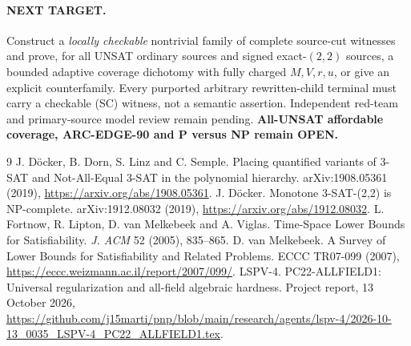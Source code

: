 \documentclass[11pt]{article}
\begin{document}
\paragraph{NEXT TARGET.} Construct a \emph{locally checkable} nontrivial family of complete source-cut witnesses and prove, for all UNSAT ordinary sources and signed exact-$(2,2)$ sources, a bounded adaptive coverage dichotomy with fully charged $M,V,r,u$, or give an explicit counterfamily. Every purported arbitrary rewritten-child terminal must carry a checkable (SC) witness, not a semantic assertion. Independent red-team and primary-source model review remain pending. \textbf{All-UNSAT affordable coverage, ARC-EDGE-90 and P versus NP remain OPEN.}
\begin{thebibliography}{9}
 J. D{\"o}cker, B. Dorn, S. Linz and C. Semple. Placing quantified variants of 3-SAT and Not-All-Equal 3-SAT in the polynomial hierarchy. arXiv:1908.05361 (2019), \url{https://arxiv.org/abs/1908.05361}.
 J. D{\"o}cker. Monotone 3-SAT-(2,2) is NP-complete. arXiv:1912.08032 (2019), \url{https://arxiv.org/abs/1912.08032}.
 L. Fortnow, R. Lipton, D. van Melkebeek and A. Viglas. Time-Space Lower Bounds for Satisfiability. \emph{J. ACM} 52 (2005), 835--865.
 D. van Melkebeek. A Survey of Lower Bounds for Satisfiability and Related Problems. ECCC TR07-099 (2007), \url{https://eccc.weizmann.ac.il/report/2007/099/}.
 LSPV-4. PC22-ALLFIELD1: Universal regularization and all-field algebraic hardness. Project report, 13 October 2026, \url{https://github.com/j15marti/pnp/blob/main/research/agents/lspv-4/2026-10-13_0035_LSPV-4_PC22_ALLFIELD1.tex}.
\end{thebibliography}
\end{document}
